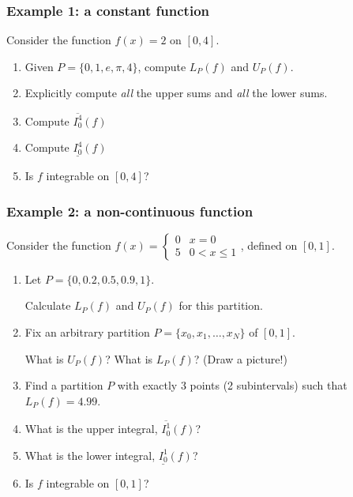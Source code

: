 \documentclass[14pt]{beamer}
\newcommand {\DS} [1] {${\displaystyle #1}$}
\newcommand{\setsize}[1]{\fontsize{#1}{#1}\selectfont} %
\newcommand{\smallerfont}{\setsize{13}} %
\begin{document}
\begin{frame}[t]
\smallerfont
\frametitle{Example 1: a constant function}

Consider the function \;  $f(x)=2$ \; on \; $[0,4]$.
\vspace{.2cm}

\begin{enumerate}
	\item  Given \DS{P =\{ 0, 1, e, \pi, 4  \}}, compute \DS{L_P(f)} and \DS{U_P(f)}.
	\item  Explicitly compute \emph{all} the upper sums and \emph{all} the lower sums.
\vspace{.2cm}
	\item  Compute \DS{\overline{I_0^4}(f)}
\vspace{.2cm}
	\item  Compute \DS{\underline{I_0^4}(f)}
\vspace{.2cm}
	\item Is $f$ integrable on $[0,4]$?
\end{enumerate}

\end{frame}
\begin{frame}[t]
\smallerfont
\frametitle{Example 2: a non-continuous function}

Consider the function \; \DS{f(x) = \begin{cases} 0 & x = 0 \\ 5 & 0 < x \leq 1 \end{cases}}, \;defined on $[0,1]$. 


    \begin{enumerate}
    	\item Let \DS{P = \{0, 0.2, 0.5, 0.9, 1 \}}.  
\vspace{.1cm}	
	
		Calculate \DS{L_P(f)} and \DS{U_P(f)} for this partition.
 \vspace{.1cm}	
  	\item Fix an arbitrary partition $P = \{x_0, x_1, \dots, x_N\}$ of $[0,1]$. \\
\vspace{.1cm}	

		What is $U_P(f)$?  What is \DS{L_P(f)}?  (Draw a picture!)
\vspace{.1cm}	
	\item  Find a partition $P$ with exactly 3 points (2 subintervals) such that \DS{L_P(f) = 4.99}.
    	\item What is the upper integral, $\overline{I_0^1}(f)$? 
    	\item What is the lower integral, $\underline{I_0^1}(f)$? 
    	\item Is $f$ integrable on $[0,1]$?
    \end{enumerate}

\end{frame}
\end{document}
